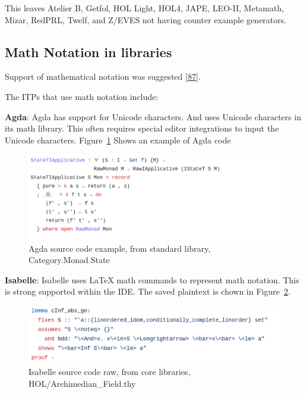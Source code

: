 \documentclass[
]{article}
\begin{document}
This leaves Atelier B, Getfol, HOL Light, HOL4, JAPE, LEO-II, Metamath,
Mizar, RedPRL, Twelf, and Z/EVES not having counter example generators.

\hypertarget{sec:math_notation}{%
\subsection{Math Notation in libraries}\label{sec:math_notation}}

Support of mathematical notation was suggested
{[}\protect\hyperlink{ref-zacchiroli_user_2007}{87}{]}.

The ITPs that use math notation include:

\textbf{Agda}: Agda has support for Unicode characters. And uses Unicode
characters in its math library. This often requires special editor
integrations to input the Unicode characters. Figure~\ref{fig:agda_code}
Shows an example of Agda code

\begin{figure}
\hypertarget{fig:agda_code}{%
\centering
\includegraphics{Images/Notation/Agda.png}
\caption{Agda source code example, from standard library,
Category.Monad.State}\label{fig:agda_code}
}
\end{figure}

\textbf{Isabelle}: Isabelle uses LaTeX math commands to represent math
notation. This is strong supported within the IDE. The saved plaintext
is chown in Figure~\ref{fig:isabelle_raw}.

\begin{figure}
\hypertarget{fig:isabelle_raw}{%
\centering
\includegraphics{Images/Notation/IsabelleRaw.png}
\caption{Isabelle source code raw, from core libraries,
HOL/Archimedian\_Field.thy}\label{fig:isabelle_raw}
}
\end{figure}
\end{document}
